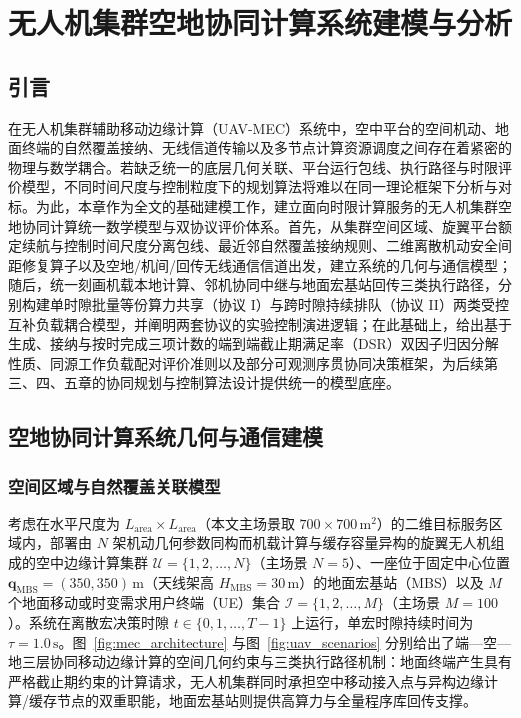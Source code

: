 \chapter{无人机集群空地协同计算系统建模与分析}
\label{cha:related-technologies}

\section{引言}
\label{sec:ch2-intro}

在无人机集群辅助移动边缘计算（UAV-MEC）系统中，空中平台的空间机动、地面终端的自然覆盖接纳、无线信道传输以及多节点计算资源调度之间存在着紧密的物理与数学耦合。若缺乏统一的底层几何关联、平台运行包线、执行路径与时限评价模型，不同时间尺度与控制粒度下的规划算法将难以在同一理论框架下分析与对标。为此，本章作为全文的基础建模工作，建立面向时限计算服务的无人机集群空地协同计算统一数学模型与双协议评价体系。首先，从集群空间区域、旋翼平台额定续航与控制时间尺度分离包线、最近邻自然覆盖接纳规则、二维离散机动安全间距修复算子以及空地/机间/回传无线通信信道出发，建立系统的几何与通信模型；随后，统一刻画机载本地计算、邻机协同中继与地面宏基站回传三类执行路径，分别构建单时隙批量等份算力共享（协议 I）与跨时隙持续排队（协议 II）两类受控互补负载耦合模型，并阐明两套协议的实验控制演进逻辑；在此基础上，给出基于生成、接纳与按时完成三项计数的端到端截止期满足率（DSR）双因子归因分解性质、同源工作负载配对评价准则以及部分可观测序贯协同决策框架，为后续第三、四、五章的协同规划与控制算法设计提供统一的模型底座。

\section{空地协同计算系统几何与通信建模}
\label{sec:ch2-swarm-planning}
\label{sec:uav-mec-technology}

\subsection{空间区域与自然覆盖关联模型}
\label{sec:ch2-swarm-levels}
\label{subsec:mec-overview}

考虑在水平尺度为 $L_{\mathrm{area}}\times L_{\mathrm{area}}$（本文主场景取 $700\times 700\,\mathrm{m}^2$）的二维目标服务区域内，部署由 $N$ 架机动几何参数同构而机载计算与缓存容量异构的旋翼无人机组成的空中边缘计算集群 $\mathcal{U}=\{1,2,\ldots,N\}$（主场景 $N=5$）、一座位于固定中心位置 $\mathbf{q}_{\mathrm{MBS}}=(350,350)\,\mathrm{m}$（天线架高 $H_{\mathrm{MBS}}=30\,\mathrm{m}$）的地面宏基站（MBS）以及 $M$ 个地面移动或时变需求用户终端（UE）集合 $\mathcal{I}=\{1,2,\ldots,M\}$（主场景 $M=100$）。系统在离散宏决策时隙 $t\in\{0,1,\ldots,T-1\}$ 上运行，单宏时隙持续时间为 $\tau=1.0\,\mathrm{s}$。图~\ref{fig:mec_architecture} 与图~\ref{fig:uav_scenarios} 分别给出了端—空—地三层协同移动边缘计算的空间几何约束与三类执行路径机制：地面终端产生具有严格截止期约束的计算请求，无人机集群同时承担空中移动接入点与异构边缘计算/缓存节点的双重职能，地面宏基站则提供高算力与全量程序库回传支撑\cite{chung2018swarm,shi2016edge,mao2017survey,abbas2018mobile,wang2020edge}。

